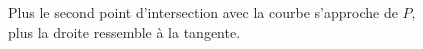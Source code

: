 \begin{figure}[ht]
\centering
	\begin{ParamsTanApproxDerr}{0.5}
	\end{ParamsTanApproxDerr}
\caption{Plus le second point d'intersection avec la courbe s'approche de $P$, plus la droite ressemble à la tangente.}\label{FigTanApproxSuite}
\end{figure}




